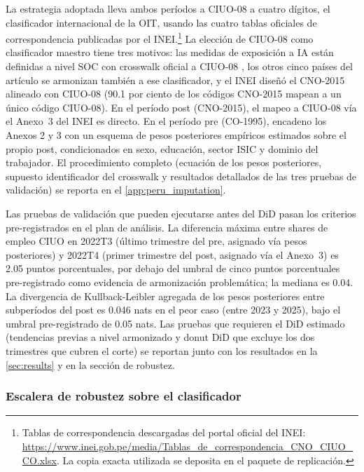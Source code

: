 La estrategia adoptada lleva ambos per\'{i}odos a CIUO-08 a cuatro d\'{i}gitos, el clasificador internacional de la OIT, usando las cuatro tablas oficiales de correspondencia publicadas por el INEI.\footnote{Tablas de correspondencia descargadas del portal oficial del INEI: \url{https://www.inei.gob.pe/media/Tablas_de_correspondencia_CNO_CIUO_CO.xlsx}. La copia exacta utilizada se deposita en el paquete de replicaci\'{o}n.} La elecci\'{o}n de CIUO-08 como clasificador maestro tiene tres motivos: las medidas de exposici\'{o}n a IA est\'{a}n definidas a nivel SOC con crosswalk oficial a CIUO-08 \citep{Felten2023_ai_exposure, Webb2020_ai_exposure, Eloundou2023_gpt_exposure}, los otros cinco pa\'{i}ses del art\'{i}culo se armonizan tambi\'{e}n a ese clasificador, y el INEI dise\~{n}\'{o} el CNO-2015 alineado con CIUO-08 (90.1 por ciento de los c\'{o}digos CNO-2015 mapean a un \'{u}nico c\'{o}digo CIUO-08). En el per\'{i}odo post (CNO-2015), el mapeo a CIUO-08 v\'{i}a el Anexo~3 del INEI es directo. En el per\'{i}odo pre (CO-1995), encadeno los Anexos 2 y 3 con un esquema de pesos posteriores emp\'{i}ricos estimados sobre el propio post, condicionados en sexo, educaci\'{o}n, sector ISIC y dominio del trabajador. El procedimiento completo (ecuaci\'{o}n de los pesos posteriores, supuesto identificador del crosswalk y resultados detallados de las tres pruebas de validaci\'{o}n) se reporta en el \cref{app:peru_imputation}.

Las pruebas de validaci\'{o}n que pueden ejecutarse antes del DiD pasan los criterios pre-registrados en el plan de an\'{a}lisis. La diferencia m\'{a}xima entre shares de empleo CIUO en 2022T3 (\'{u}ltimo trimestre del pre, asignado v\'{i}a pesos posteriores) y 2022T4 (primer trimestre del post, asignado v\'{i}a el Anexo~3) es 2.05 puntos porcentuales, por debajo del umbral de cinco puntos porcentuales pre-registrado como evidencia de armonizaci\'{o}n problem\'{a}tica; la mediana es 0.04. La divergencia de Kullback-Leibler agregada de los pesos posteriores entre subper\'{i}odos del post es 0.046 nats en el peor caso (entre 2023 y 2025), bajo el umbral pre-registrado de 0.05 nats. Las pruebas que requieren el DiD estimado (tendencias previas a nivel armonizado y donut DiD que excluye los dos trimestres que cubren el corte) se reportan junto con los resultados en la \cref{sec:results} y en la secci\'{o}n de robustez.

\subsubsection*{Escalera de robustez sobre el clasificador}

